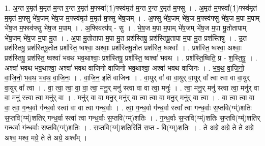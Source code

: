 \documentclass[17pt]{extarticle}
\begin{document}
1. अ॒न्त र॒मृत॑ म॒मृत॑ म॒न्त र॒न्त र॒मृत॑ म॒फ्स्वा᳚(1॒)फ्स्व॑मृत॑ म॒न्त र॒न्त र॒मृत॑ म॒फ्सु । . अ॒मृत॑ म॒फ्स्वा᳚(1॒)फ्स्व॑मृत॑ म॒मृत॑ म॒फ्सु भे॑ष॒जम् भे॑ष॒ज म॒फ्स्व॑मृत॑ म॒मृत॑ म॒फ्सु भे॑ष॒जम् । . अ॒फ्सु भे॑ष॒जम् भे॑ष॒ज म॒फ्स्व॑फ्सु भे॑ष॒ज म॒पा म॒पाम् भे॑ष॒ज म॒फ्स्व॑फ्सु भे॑ष॒ज म॒पाम् । . अ॒फ्स्वित्य॑प् - सु । . भे॒ष॒ज म॒पा म॒पाम् भे॑ष॒जम् भे॑ष॒ज म॒पा मु॒तोतापाम् भे॑ष॒जम् भे॑ष॒ज म॒पा मु॒त । . अ॒पा मु॒तोतापा म॒पा मु॒त प्रश॑स्तिषु॒ प्रश॑स्तिषू॒तापा म॒पा मु॒त प्रश॑स्तिषु । . उ॒त प्रश॑स्तिषु॒ प्रश॑स्तिषू॒तोत प्रश॑स्ति॒ ष्वश्वा॒ अश्वाः॒ प्रश॑स्तिषू॒तोत प्रश॑स्ति॒ ष्वश्वाः᳚ । . प्रश॑स्ति॒ ष्वश्वा॒ अश्वाः॒ प्रश॑स्तिषु॒ प्रश॑स्ति॒ ष्वश्वा॑ भवथ भव॒थाश्वाः॒ प्रश॑स्तिषु॒ प्रश॑स्ति॒ ष्वश्वा॑ भवथ । . प्रश॑स्ति॒ष्विति॒ प्र - श॒स्ति॒षु॒ । . अश्वा॑ भवथ भव॒थाश्वा॒ अश्वा॑ भवथ वाजिनो वाजिनो भव॒थाश्वा॒ अश्वा॑ भवथ वाजिनः । . भ॒व॒थ॒ वा॒जि॒नो॒ वा॒जि॒नो॒ भ॒व॒थ॒ भ॒व॒थ॒ वा॒जि॒नः॒ । . वा॒जि॒न॒ इति॑ वाजिनः । . वा॒युर् वा॑ वा वा॒युर् वा॒युर् वा᳚ त्वा त्वा वा वा॒युर् वा॒युर् वा᳚ त्वा । . वा॒ त्वा॒ त्वा॒ वा॒ वा॒ त्वा॒ मनु॒र् मनु॑ स्त्वा वा वा त्वा॒ मनुः॑ । . त्वा॒ मनु॒र् मनु॑ स्त्वा त्वा॒ मनु॑र् वा वा॒ मनु॑ स्त्वा त्वा॒ मनु॑र् वा । . मनु॑र् वा वा॒ मनु॒र् मनु॑र् वा त्वा त्वा वा॒ मनु॒र् मनु॑र् वा त्वा । . वा॒ त्वा॒ त्वा॒ वा॒ वा॒ त्वा॒ ग॒न्ध॒र्वा ग॑न्ध॒र्वा स्त्वा॑ वा वा त्वा गन्ध॒र्वाः । . त्वा॒ ग॒न्ध॒र्वा ग॑न्ध॒र्वा स्त्वा᳚ त्वा गन्ध॒र्वाः स॒प्तवि(ग्म्॑)शतिः स॒प्तवि(ग्म्॑)शतिर् गन्ध॒र्वा स्त्वा᳚ त्वा गन्ध॒र्वाः स॒प्तवि(ग्म्॑)शतिः । . ग॒न्ध॒र्वाः स॒प्तवि(ग्म्॑)शतिः स॒प्तवि(ग्म्॑)शतिर् गन्ध॒र्वा ग॑न्ध॒र्वाः स॒प्तवि(ग्म्॑)शतिः । . स॒प्तवि(ग्म्॑)शति॒रिति॑ स॒प्त - वि॒(ग्म्॒)श॒तिः॒ । . ते अग्रे॒ अग्रे॒ ते ते अग्रे॒ अश्व॒ मश्व॒ मग्रे॒ ते ते अग्रे॒ अश्व᳚म् । \newline
\end{document}
